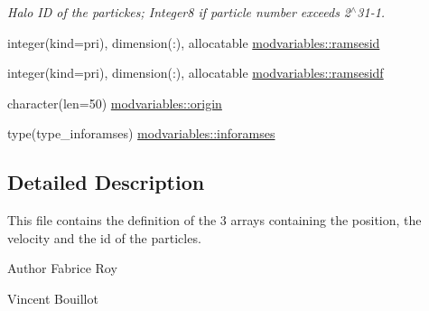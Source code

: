 \begin{DoxyCompactItemize}
\begin{DoxyCompactList}\small\item\em Halo ID of the partickes; Integer8 if particle number exceeds 2$^\wedge$31-\/1. \end{DoxyCompactList}\item 
integer(kind=pri), dimension(\+:), allocatable \hyperlink{namespacemodvariables_ae6b45a68a4cbf0ccbbf7c08ee87e3573}{modvariables\+::ramsesid}
\item 
integer(kind=pri), dimension(\+:), allocatable \hyperlink{namespacemodvariables_a960cf3d5497024438caba54185cd7793}{modvariables\+::ramsesidf}
\item 
character(len=50) \hyperlink{namespacemodvariables_a9f9928f8307cdd707b3a7d360a992f9f}{modvariables\+::origin}
\item 
type(type\+\_\+inforamses) \hyperlink{namespacemodvariables_ac84b14c43266126c4d7120ba0b8f48f4}{modvariables\+::inforamses}
\end{DoxyCompactItemize}


\subsection{Detailed Description}
This file contains the definition of the 3 arrays containing the position, the velocity and the id of the particles. 

\begin{DoxyAuthor}{Author}
Fabrice Roy 

Vincent Bouillot 
\end{DoxyAuthor}
